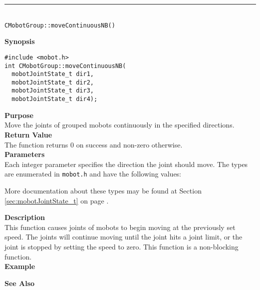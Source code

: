 \noindent
\vspace{5pt}
\rule{4.5in}{0.015in}\\
\noindent
{\LARGE \texttt{CMobotGroup::moveContinuousNB()}}\\
{}

\noindent
{\bf Synopsis}
\vspace{-8pt}
\begin{verbatim}
#include <mobot.h>
int CMobotGroup::moveContinuousNB(
  mobotJointState_t dir1, 
  mobotJointState_t dir2, 
  mobotJointState_t dir3, 
  mobotJointState_t dir4);
\end{verbatim}

\noindent
{\bf Purpose}\\
Move the joints of grouped mobots continuously in the specified directions.\\

\noindent
{\bf Return Value}\\
The function returns 0 on success and non-zero otherwise.\\

\noindent
{\bf Parameters}\\
Each integer parameter specifies the direction the joint should move. The types
are enumerated in \texttt{mobot.h} and have the following values:

More documentation about these types may be found at Section
\ref{sec:mobotJointState_t} on page
\pageref{sec:mobotJointState_t}.

\noindent
{\bf Description}\\
This function causes joints of mobots to begin moving at the previously set
speed. The joints will continue moving until the joint hits a joint limit, or
the joint is stopped by setting the speed to zero. This function is a non-blocking
function.\\

\noindent
{\bf Example}\\
\noindent

\noindent
{\bf See Also}\\

